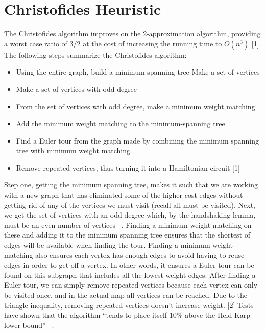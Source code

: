 \documentclass{article}
\author{William Davies, Trent Louie}
\begin{document}
\section{Christofides Heuristic}

The Christofides algorithm improves on the 2-approximation algorithm, providing
a worst case ratio of $3/2$ at the cost of increasing the running time to
$O(n^3)$ [1].\\

The following steps summarize the Christofides algorithm:
\begin{itemize}
  \item Using the entire graph, build a minimum-spanning tree Make a set of
        vertices
  \item Make a set of vertices with odd degree
  \item From the set of vertices with odd degree, make a minimum weight matching
  \item Add the minimum weight matching to the minimum-spanning tree
  \item Find a Euler tour from the graph made by combining the minimum spanning
        tree with minimum weight matching
  \item Remove repeated vertices, thus turning it into a Hamiltonian circuit [1]
\end{itemize}

Step one, getting the minimum spanning tree, makes it such that we are working
with a new graph that has eliminated some of the higher cost edges without
getting rid of any of the vertices we must visit (recall all must be visited).
Next, we get the set of vertices with an odd degree which, by the handshaking
lemma, must be an even number of vertices ~\cite{goodrich2015christofides}. Finding a minimum weight matching
on these and adding it to the minimum spanning tree ensures that the shortest
of edges will be available when finding the tour. Finding a minimum weight
matching also ensures each vertex has enough edges to avoid having to reuse
edges in order to get off a vertex. In other words, it ensures a Euler tour
can be found on this subgraph that includes all the lowest-weight edges. After
finding a Euler tour, we can simply remove repeated vertices because each vertex
can only be visited once, and in the actual map all vertices can be reached. Due
to the triangle inequality, removing repeated vertices doesn’t increase weight.
[2] Tests have shown that the algorithm “tends to place itself 10\% above the
Held-Karp lower bound” ~\cite{nilsson2003heuristics}.\\
\end{document}
